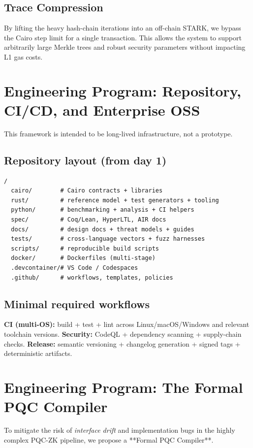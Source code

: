 \documentclass[conference]{IEEEtran}
\theoremstyle{definition}
\theoremstyle{plain}
\theoremstyle{remark}
\begin{document}
\subsection{Trace Compression}
By lifting the heavy hash-chain iterations into an off-chain STARK, we bypass the Cairo step limit for a single transaction. This allows the system to support arbitrarily large Merkle trees and robust security parameters without impacting L1 gas costs.

\section{Engineering Program: Repository, CI/CD, and Enterprise OSS}
This framework is intended to be long-lived infrastructure, not a prototype.

\subsection*{Repository layout (from day 1)}
\begin{lstlisting}
/
  cairo/        # Cairo contracts + libraries
  rust/         # reference model + test generators + tooling
  python/       # benchmarking + analysis + CI helpers
  spec/         # Coq/Lean, HyperLTL, AIR docs
  docs/         # design docs + threat models + guides
  tests/        # cross-language vectors + fuzz harnesses
  scripts/      # reproducible build scripts
  docker/       # Dockerfiles (multi-stage)
  .devcontainer/# VS Code / Codespaces
  .github/      # workflows, templates, policies
\end{lstlisting}

\subsection*{Minimal required workflows}
\textbf{CI (multi-OS):} build + test + lint across Linux/macOS/Windows and relevant toolchain versions.  
\textbf{Security:} CodeQL + dependency scanning + supply-chain checks.  
\textbf{Release:} semantic versioning + changelog generation + signed tags + deterministic artifacts.
\section{Engineering Program: The Formal PQC Compiler}
To mitigate the risk of \textit{interface drift} and implementation bugs in the highly complex PQC-ZK pipeline, we propose a **Formal PQC Compiler**. 
\end{document}

